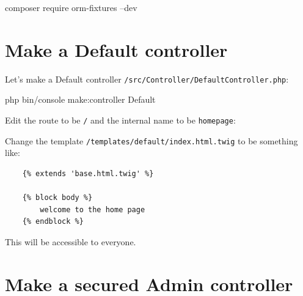 \documentclass[a4paperpaper,openright]{book}
\newenvironment{Shaded}{}{}
\newcommand{\AnnotationTok}[1]{\textcolor[rgb]{0.38,0.63,0.69}{\textbf{\textit{#1}}}}
\newcommand{\CommentTok}[1]{\textcolor[rgb]{0.38,0.63,0.69}{\textit{#1}}}
\newcommand{\ExtensionTok}[1]{#1}
\newcommand{\KeywordTok}[1]{\textcolor[rgb]{0.00,0.44,0.13}{\textbf{#1}}}
\newcommand{\NormalTok}[1]{#1}
\newcommand{\OtherTok}[1]{\textcolor[rgb]{0.00,0.44,0.13}{#1}}
\newcommand{\StringTok}[1]{\textcolor[rgb]{0.25,0.44,0.63}{#1}}
\begin{document}
\begin{Shaded}
\begin{Highlighting}[]
    \ExtensionTok{composer}\NormalTok{ require orm-fixtures --dev }
\end{Highlighting}
\end{Shaded}

\hypertarget{make-a-default-controller}{%
\section{Make a Default controller}\label{make-a-default-controller}}

Let's make a Default controller
\texttt{/src/Controller/DefaultController.php}:

\begin{Shaded}
\begin{Highlighting}[]
    \ExtensionTok{php}\NormalTok{ bin/console make:controller Default}
\end{Highlighting}
\end{Shaded}

Edit the route to be \texttt{/} and the internal name to be
\texttt{homepage}:

\begin{Shaded}
\end{Shaded}

Change the template \texttt{/templates/default/index.html.twig} to be
something like:

\begin{verbatim}
    {% extends 'base.html.twig' %}

    {% block body %}
        welcome to the home page
    {% endblock %}
\end{verbatim}

This will be accessible to everyone.

\hypertarget{make-a-secured-admin-controller}{%
\section{Make a secured Admin
controller}\label{make-a-secured-admin-controller}}
\end{document}

